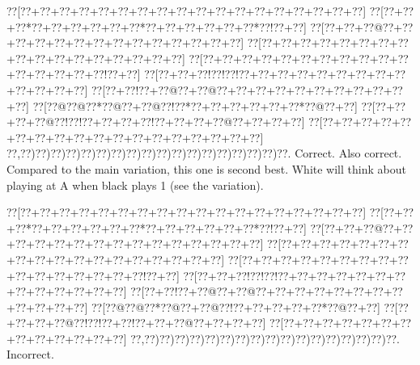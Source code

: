 \documentclass[a5paper]{article}
\begin{document}
\begin{center}
{\goo
\0??[\0??+\0??+\0??+\0??+\0??+\0??+\0??+\0??+\0??+\0??+\0??+\0??+\0??+\0??+\0??+\0??+\0??+\0??]
\0??[\0??+\0??+\0??*\0??+\0??+\0??+\0??+\0??+\0??*\0??+\0??+\0??+\0??+\0??+\0??*\0??!\0??+\0??]
\0??[\0??+\0??+\0??@\0??+\0??+\0??+\0??+\0??+\0??+\0??+\0??+\0??+\0??+\0??+\0??+\0??+\0??]
\0??[\0??+\0??+\0??+\0??+\0??+\0??+\0??+\0??+\0??+\0??+\0??+\0??+\0??+\0??+\0??+\0??+\0??]
\0??[\0??+\0??+\0??+\0??+\0??+\0??+\0??+\0??+\0??+\0??+\0??+\0??+\0??+\0??+\0??+\0??!\0??+\0??]
\0??[\0??+\0??+\0??!\0??!\0??!\0??+\0??+\0??+\0??+\0??+\0??+\0??+\0??+\0??+\0??+\0??+\0??+\0??]
\0??[\0??+\0??!\0??+\0??@\0??+\0??@\0??+\0??+\0??+\0??+\0??+\0??+\0??+\0??+\0??+\0??+\0??]
\0??[\0??@\0??@\0??*\0??@\0??+\0??@\0??!\0??*\0??+\0??+\0??+\0??+\0??+\0??*\0??@\0??+\0??]
\0??[\0??+\0??+\0??+\0??@\0??!\0??!\0??+\0??+\0??+\0??!\0??+\0??+\0??+\0??@\0??+\0??+\0??+\0??]
\0??[\0??+\0??+\0??+\0??+\0??+\0??+\0??+\0??+\0??+\0??+\0??+\0??+\0??+\0??+\0??+\0??+\0??+\0??]
\0??,\0??)\0??)\0??)\0??)\0??)\0??)\0??)\0??)\0??)\0??)\0??)\0??)\0??)\0??)\0??)\0??)\0??)\0??.
}
Correct. Also correct. Compared to the main variation, this one is second best. White will think about playing at A when black plays 1 (see the variation).

\end{center}
\begin{center}
{\goo
\0??[\0??+\0??+\0??+\0??+\0??+\0??+\0??+\0??+\0??+\0??+\0??+\0??+\0??+\0??+\0??+\0??+\0??+\0??]
\0??[\0??+\0??+\0??*\0??+\0??+\0??+\0??+\0??+\0??*\0??+\0??+\0??+\0??+\0??+\0??*\0??!\0??+\0??]
\0??[\0??+\0??+\0??@\0??+\0??+\0??+\0??+\0??+\0??+\0??+\0??+\0??+\0??+\0??+\0??+\0??+\0??+\0??]
\0??[\0??+\0??+\0??+\0??+\0??+\0??+\0??+\0??+\0??+\0??+\0??+\0??+\0??+\0??+\0??+\0??+\0??+\0??]
\0??[\0??+\0??+\0??+\0??+\0??+\0??+\0??+\0??+\0??+\0??+\0??+\0??+\0??+\0??+\0??+\0??!\0??+\0??]
\0??[\0??+\0??+\0??!\0??!\0??!\0??+\0??+\0??+\0??+\0??+\0??+\0??+\0??+\0??+\0??+\0??+\0??+\0??]
\0??[\0??+\0??!\0??+\0??@\0??+\0??@\0??+\0??+\0??+\0??+\0??+\0??+\0??+\0??+\0??+\0??+\0??+\0??]
\0??[\0??@\0??@\0??*\0??@\0??+\0??@\0??!\0??+\0??+\0??+\0??+\0??*\0??@\0??+\0??]
\0??[\0??+\0??+\0??+\0??@\0??!\0??!\0??+\0??!\0??+\0??+\0??@\0??+\0??+\0??+\0??]
\0??[\0??+\0??+\0??+\0??+\0??+\0??+\0??+\0??+\0??+\0??+\0??+\0??+\0??]
\0??,\0??)\0??)\0??)\0??)\0??)\0??)\0??)\0??)\0??)\0??)\0??)\0??)\0??)\0??)\0??)\0??)\0??.
}
Incorrect. 

\end{center}
\end{document}
